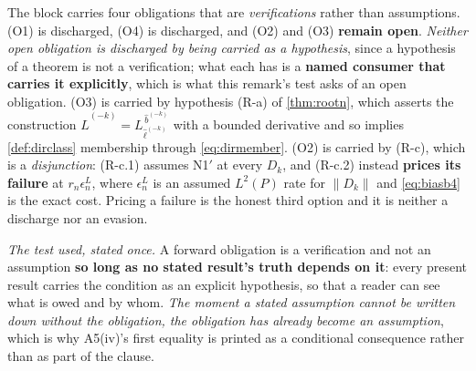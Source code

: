 \begin{remark}\label{rem:obligations}
The block carries four obligations that are \emph{verifications} rather than assumptions.
\textup{(O1)} is discharged, \textup{(O4)} is discharged, and \textup{(O2)} and \textup{(O3)}
\textbf{remain open}. \emph{Neither open obligation is discharged by being carried as a hypothesis},
since a hypothesis of a theorem is not a verification; what each has is a \textbf{named consumer that
carries it explicitly}, which is what this remark's test asks of an open obligation.
\textup{(O3)} is carried by hypothesis (R-a) of \cref{thm:rootn}, which
asserts the construction $\hat L^{(-k)}=L^{\,\hat b^{(-k)}}_{\hat\ell^{(-k)}}$ with a bounded derivative and
so implies \cref{def:dirclass} membership through \eqref{eq:dirmember}. \textup{(O2)} is carried by (R-c),
which is a \emph{disjunction}: (R-c.1) assumes N1$'$ at every $D_k$, and (R-c.2) instead \textbf{prices its
failure} at $r_n\epsilon^{L}_n$, where $\epsilon^{L}_n$ is an assumed $L^{2}(P)$ rate for $\|D_k\|$ and
\eqref{eq:biasb4} is the exact cost. Pricing a failure is the
honest third option and it is neither a discharge nor an evasion.

\emph{The test used, stated once.} A forward obligation is a verification and not an assumption
\textbf{so long as no stated result's truth depends on it}: every present result carries the condition
as an explicit hypothesis, so that a reader can see what is owed and by whom. \emph{The moment a stated
assumption cannot be written down without the obligation, the obligation has already become an
assumption}, which is why A5(iv)'s first equality is
printed as a conditional consequence rather than as part of the clause.


\end{remark}
